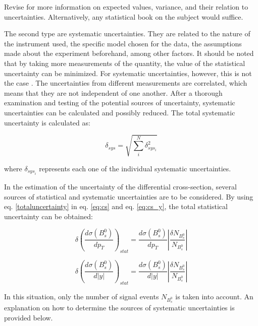 Revise \cite{vsirca2016probability} for more information on expected values, variance, and their relation to uncertainties. Alternatively, any statistical book on the subject would suffice.

The second type are systematic uncertainties. They are related to the nature of the instrument used, the specific model chosen for the data, the assumptions made about the experiment beforehand, among other factors. It should be noted that by taking more measurements of the quantity, the value of the statistical uncertainty can be minimized. For systematic uncertainties, however, this is not the case \cite{sinervo2003definition}. The uncertainties from different measurements are correlated, which means that they are not independent of one another. After a thorough examination and testing of the potential sources of uncertainty, systematic uncertainties can be calculated and possibly reduced. The total systematic uncertainty is calculated as:

\begin{equation}
	\delta_{sys} = \sqrt{\sum_{i}^{N} \delta_{{sys}_{i}}^2}
\end{equation}

where $\delta_{{sys}_i}$ represents each one of the individual systematic uncertainties.

In the estimation of the uncertainty of the differential cross-section, several sources of statistical and systematic uncertainties are to be considered. By using eq. \ref{totaluncertainty} in eq. \ref{eq:cs} and eq. \ref{eq:cs_y}, the total statistical uncertainty can be obtained:

\begin{equation}
	\delta \left(\frac{d\sigma(B_s^0)}{dp_T} \right)_{stat} 
 =\frac{d \sigma(B_s^0)}{dp_T}\left| \frac{\delta N_{B_s^{0}}}{N_{B_s^{0}}}\right|
 \end{equation}

\begin{equation}
	\delta \left(\frac{d\sigma(B_s^0)}{d|y|} \right)_{stat} 
	=\frac{d \sigma(B_s^0)}{d|y|}\left| \frac{\delta N_{B_s^{0}}}{N_{B_s^{0}}}\right|
\end{equation}

In this situation, only the number of signal events $N_{B_s^{0}}$ is taken into account. An explanation on how to determine the sources of systematic uncertainties is provided below. 

